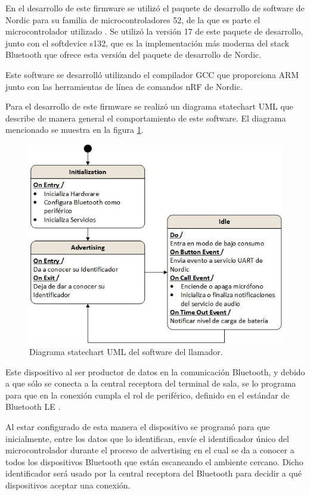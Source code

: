 En el desarrollo de este firmware se utilizó el paquete de desarrollo de software de Nordic para su familia de microcontroladores 52, de la que es parte el microcontrolador utilizado \citep{SDK}. Se utilizó la versión 17 de este paquete de desarrollo,  junto con el softdevice s132, que es la implementación más moderna del stack Bluetooth que ofrece esta versión del paquete de desarrollo de Nordic.

Este software se desarrolló utilizando el compilador GCC que proporciona ARM junto con las herramientas de línea de comandos nRF de Nordic.

Para el desarrollo de este firmware se realizó un diagrama statechart UML que describe de manera general el comportamiento de este software. El diagrama mencionado se muestra en la figura \ref{fig:DiagramaSoftLlam}.

\begin{figure}[htpb]
	\centering
	\includegraphics[scale=0.8]{./Figures/DCaller.jpeg}
	\caption{Diagrama statechart UML del software del llamador.}
	\label{fig:DiagramaSoftLlam}
\end{figure}

Este dispositivo al ser productor de datos en la comunicación Bluetooth, y debido a que sólo se conecta a la central receptora del terminal de sala, se lo programa para que en la conexión cumpla el rol de periférico, definido en el estándar de Bluetooth LE \citep{BLESPEC}. 

Al estar configurado de esta manera el dispositivo se programó para que inicialmente, entre los datos que lo identifican, envíe el identificador único del microcontrolador durante el proceso de advertising en el cual se da a conocer a todos los dispositivos Bluetooth que están escaneando el ambiente cercano. Dicho identificador será usado por la central receptora del Bluetooth para decidir a qué dispositivos aceptar una conexión.

